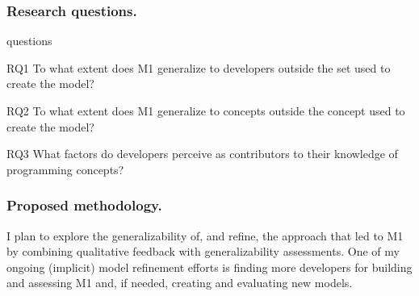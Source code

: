 \documentclass{llncs}
\begin{document}
\subsubsection{Research questions.}

\begin{labeling}{questions}
	\item [RQ1] To what extent does M1 generalize to developers outside the set used to create the model?
	\item [RQ2] To what extent does M1 generalize to concepts outside the concept used to create the model?
	\item [RQ3] What factors do developers perceive as contributors to their knowledge of programming concepts?
\end{labeling}

\subsubsection{Proposed methodology.}
I plan to explore the generalizability of, and refine, the approach that led to M1 by combining qualitative feedback with generalizability assessments. One of my ongoing (implicit) model refinement efforts is finding more developers for building and assessing M1 and, if needed, creating and evaluating new models.
\end{document}
